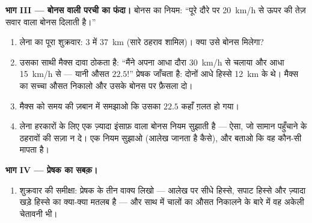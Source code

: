 \begin{problem}
\medskip\noindent\textbf{भाग III --- बोनस वाली परची का फंदा।}
बोनस का नियम: ``पूरे दौरे पर \qty{20}{km/h} से ऊपर की  तेज़
सवार वाला बोनस दिलाती है।''
\begin{enumerate}[resume]
  \item लेना का पूरा शुक्रवार: $3$  में \qty{37}{km} (सारे
        ठहराव शामिल)। क्या उसे बोनस मिलेगा?
  \item उसका साथी मैक्स दावा ठोकता है: ``मैंने अपना आधा दौरा
        \qty{30}{km/h} से चलाया और आधा \qty{15}{km/h} से --- यानी
        औसत $22.5$!'' प्रेषक जाँचता है: दोनों आधे हिस्से \qty{12}{km}
        के थे। मैक्स का सच्चा औसत निकालो और उसके बोनस पर फ़ैसला दो।
  \item मैक्स को समय की ज़बान में समझाओ कि उसका $22.5$ कहाँ ग़लत हो
        गया।
  \item लेना हरकारों के लिए एक ज़्यादा इंसाफ़ वाला बोनस नियम सुझाती
        है --- ऐसा, जो सामान पहुँचाने के ठहरावों की सज़ा न दे। एक
        नियम सुझाओ (आलेख जानता है कैसे), और बताओ कि वह कौन-सी 
        मापता है।
\end{enumerate}

\medskip\noindent\textbf{भाग IV --- प्रेषक का सबक़।}
\begin{enumerate}[resume]
  \item शुक्रवार की समीक्षा: प्रेषक के तीन वाक्य लिखो --- आलेख पर
        सीधे हिस्से, सपाट हिस्से और ज़्यादा खड़े हिस्से का क्या-क्या
        मतलब है --- और साथ में चालों का औसत निकालने के बारे में वह
        अकेली चेतावनी भी।
\end{enumerate}
\end{problem}
